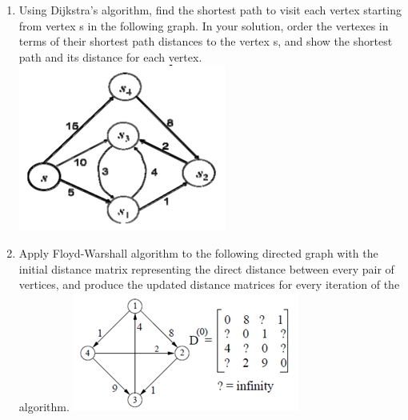 \documentclass{article}
\begin{document}
\begin{enumerate}
    \item Using Dijkstra’s algorithm, find the shortest path to visit each 
    vertex starting from vertex s in the following graph. In your solution, 
    order the vertexes in terms of their shortest path distances to the vertex 
    s, and show the shortest path and its distance for each vertex. \newline
    \includegraphics[scale=0.75]{p6_graph}\newline

    \item Apply Floyd-Warshall algorithm to the following directed graph with 
    the initial distance matrix representing the direct distance between every 
    pair of vertices, and produce the updated distance matrices for every 
    iteration of the algorithm. \newline
    \includegraphics[scale=0.75]{p7_graph}\newline
\end{enumerate}
\end{document}
